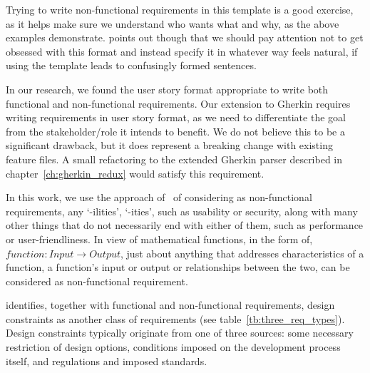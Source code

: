 \documentclass[dissertation,final]{softeng}
\newcommand{\nfrs}{non-functional requirements\xspace}
\begin{document}
Trying to write \nfrs in this template is a good exercise, as it helps make sure we understand who wants what and why, as the above examples demonstrate. \citet{CohnNFRS} points out though that we should pay attention not to get obsessed with this format and instead specify it in whatever way feels natural, if using the template leads to confusingly formed sentences.

In our research, we found the user story format appropriate to write both functional and non-functional requirements. Our extension to Gherkin requires writing requirements in user story format, as we need to differentiate the goal from the stakeholder/role it intends to benefit. We do not believe this to be a significant drawback, but it does represent a breaking change with existing feature files. A small refactoring to the extended Gherkin parser described in chapter~\ref{ch:gherkin_redux} would satisfy this requirement.

In this work, we use the approach of~\citet{Chung:2009vg} of considering as non-functional requirements, any `-ilities', `-ities', such as usability or security, along with many other things that do not necessarily end with either of them, such as performance or user-friendliness. In view of mathematical functions, in the form of, $\mathit{function} : \mathit{Input} \rightarrow \mathit{Output}$, just about anything that addresses characteristics of a function, a function's input or output or relationships between the two, can be considered as non-functional requirement.

\citet{Leffingwell2011} identifies, together with functional and non-functional requirements, design constraints as another class of requirements (see table~\ref{tb:three_req_types}). Design constraints typically originate from one of three sources: some necessary restriction of design options, conditions imposed on the development process itself, and regulations and imposed standards.

\begin{table}[h!]
\caption[Three types of Requirements]{Three types of requirements~\citep{Leffingwell2011}}
\label{tb:three_req_types}
\setlength{\extrarowheight}{1.8pt}
\centering
{}
\end{table}
\end{document}
